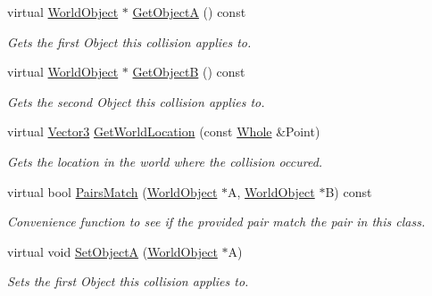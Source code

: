 \begin{DoxyCompactItemize}
virtual \hyperlink{classMezzanine_1_1WorldObject}{WorldObject} $\ast$ \hyperlink{classMezzanine_1_1Collision_a8eb039baf05fba52609fc9901ec65a4d}{GetObjectA} () const 
\begin{DoxyCompactList}\small\item\em Gets the first Object this collision applies to. \item\end{DoxyCompactList}\item 
virtual \hyperlink{classMezzanine_1_1WorldObject}{WorldObject} $\ast$ \hyperlink{classMezzanine_1_1Collision_ac86914ea74f944491a28c07f50bd3107}{GetObjectB} () const 
\begin{DoxyCompactList}\small\item\em Gets the second Object this collision applies to. \item\end{DoxyCompactList}\item 
virtual \hyperlink{classMezzanine_1_1Vector3}{Vector3} \hyperlink{classMezzanine_1_1Collision_abefbe2ba9b0aaa1830be4f1070c44480}{GetWorldLocation} (const \hyperlink{namespaceMezzanine_adcbb6ce6d1eb4379d109e51171e2e493}{Whole} \&Point)
\begin{DoxyCompactList}\small\item\em Gets the location in the world where the collision occured. \item\end{DoxyCompactList}\item 
virtual bool \hyperlink{classMezzanine_1_1Collision_ae9eb0637ebd2e5dd47992278e4776e01}{PairsMatch} (\hyperlink{classMezzanine_1_1WorldObject}{WorldObject} $\ast$A, \hyperlink{classMezzanine_1_1WorldObject}{WorldObject} $\ast$B) const 
\begin{DoxyCompactList}\small\item\em Convenience function to see if the provided pair match the pair in this class. \item\end{DoxyCompactList}\item 
virtual void \hyperlink{classMezzanine_1_1Collision_a5503aa0fdc08e9ee41205478fc3c3bbc}{SetObjectA} (\hyperlink{classMezzanine_1_1WorldObject}{WorldObject} $\ast$A)
\begin{DoxyCompactList}\small\item\em Sets the first Object this collision applies to. \item\end{DoxyCompactList}\item 

\end{DoxyCompactItemize}
